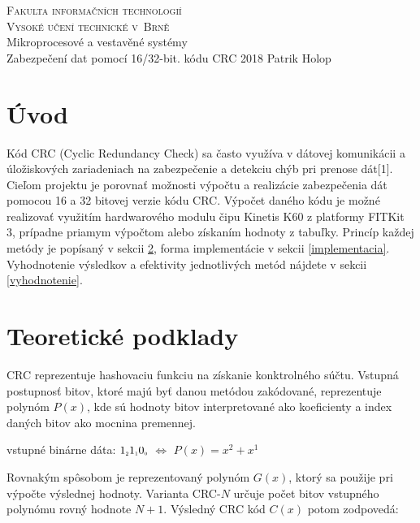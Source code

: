\documentclass[11pt,a4paper]{article}
\begin{document}
\begin{titlepage}
\begin{center}
\Huge
\textsc{Fakulta informačních technologií\\
Vysoké učení technické v~Brně}
\\[84mm]
Mikroprocesové a vestavěné systémy\\
Zabezpečení dat pomocí 16/32-bit. kódu CRC
\vfill
{\LARGE 2018 \hfill Patrik Holop}
\end{center}
\end{titlepage}

\tableofcontents
\newpage

\section{Úvod}

Kód CRC (Cyclic Redundancy Check) sa často využíva v dátovej komunikácii a úložiskových zariadeniach na zabezpečenie a detekciu chýb pri prenose dát[1]. Cieľom projektu je porovnať možnosti výpočtu a realizácie zabezpečenia dát pomocou 16 a 32 bitovej verzie kódu CRC. Výpočet daného kódu je možné realizovať využitím hardwarového modulu čipu Kinetis K60 z platformy FITKit 3, prípadne priamym výpočtom alebo získaním hodnoty z tabuľky. Princíp každej metódy je popísaný v sekcii \ref{teoria}, forma implementácie v sekcii \ref{implementacia}. Vyhodnotenie výsledkov a efektivity jednotlivých metód nájdete v sekcii \ref{vyhodnotenie}.

\section{Teoretické podklady} \label{teoria}

CRC reprezentuje hashovaciu funkciu na získanie konktrolného súčtu. Vstupná postupnosť bitov, ktoré majú byť danou metódou zakódované, reprezentuje polynóm $P(x)$, kde sú hodnoty bitov interpretované ako koeficienty a index daných bitov ako mocnina premennej.

\begin{center}
vstupné binárne dáta: $1_{\scaleto{2}{3pt}}1_{\scaleto{1}{3pt}}0_{\scaleto{0}{3pt}}$ $\Leftrightarrow$ $P(x) = x^2 + x^1$\\
\end{center}

\noindent Rovnakým spôsobom je reprezentovaný polynóm $G(x)$, ktorý sa použije pri výpočte výslednej hodnoty. Varianta CRC-$N$ určuje počet bitov vstupného polynómu rovný hodnote $N+1$. Výsledný CRC kód $C(x)$ potom zodpovedá:
\end{document}

